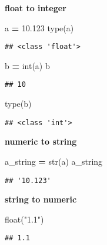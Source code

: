 \documentclass[
]{book}
\newenvironment{Shaded}{\begin{snugshade}}{\end{snugshade}}
\newcommand{\BuiltInTok}[1]{#1}
\newcommand{\FloatTok}[1]{\textcolor[rgb]{0.00,0.00,0.81}{#1}}
\newcommand{\NormalTok}[1]{#1}
\newcommand{\OperatorTok}[1]{\textcolor[rgb]{0.81,0.36,0.00}{\textbf{#1}}}
\newcommand{\StringTok}[1]{\textcolor[rgb]{0.31,0.60,0.02}{#1}}
\begin{document}
\textbf{float to integer}

\begin{Shaded}
\begin{Highlighting}[]
\NormalTok{a }\OperatorTok{=} \FloatTok{10.123}
\BuiltInTok{type}\NormalTok{(a)}
\end{Highlighting}
\end{Shaded}

\begin{verbatim}
## <class 'float'>
\end{verbatim}

\begin{Shaded}
\begin{Highlighting}[]
\NormalTok{b }\OperatorTok{=} \BuiltInTok{int}\NormalTok{(a)}
\NormalTok{b}
\end{Highlighting}
\end{Shaded}

\begin{verbatim}
## 10
\end{verbatim}

\begin{Shaded}
\begin{Highlighting}[]
\BuiltInTok{type}\NormalTok{(b)}
\end{Highlighting}
\end{Shaded}

\begin{verbatim}
## <class 'int'>
\end{verbatim}

\textbf{numeric to string}

\begin{Shaded}
\begin{Highlighting}[]
\NormalTok{a\_string }\OperatorTok{=} \BuiltInTok{str}\NormalTok{(a)}
\NormalTok{a\_string}
\end{Highlighting}
\end{Shaded}

\begin{verbatim}
## '10.123'
\end{verbatim}

\textbf{string to numeric}

\begin{Shaded}
\begin{Highlighting}[]
\BuiltInTok{float}\NormalTok{(}\StringTok{"1.1"}\NormalTok{)}
\end{Highlighting}
\end{Shaded}

\begin{verbatim}
## 1.1
\end{verbatim}
\end{document}
